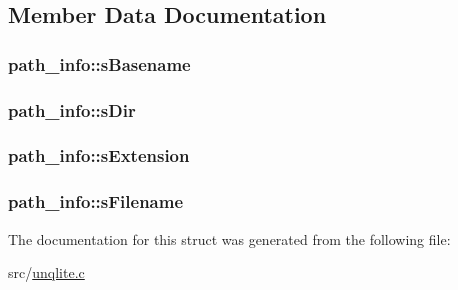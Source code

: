 \subsection{Member Data Documentation}
\hypertarget{structpath__info_aa69edee8fe617238ae6cc09a1137e516}{
\subsubsection[{s\-Basename}]{ path\-\_\-info\-::s\-Basename}}\label{d3/d46/structpath__info_aa69edee8fe617238ae6cc09a1137e516}
\hypertarget{structpath__info_aea865c2965bdfd0fe686550074bcf8cf}{
\subsubsection[{s\-Dir}]{ path\-\_\-info\-::s\-Dir}}\label{d3/d46/structpath__info_aea865c2965bdfd0fe686550074bcf8cf}
\hypertarget{structpath__info_a341842278bfb23bfd8edce7cc208a988}{
\subsubsection[{s\-Extension}]{ path\-\_\-info\-::s\-Extension}}\label{d3/d46/structpath__info_a341842278bfb23bfd8edce7cc208a988}
\hypertarget{structpath__info_ae495b29fdcfd0b9ff97f011d7cfb0bef}{
\subsubsection[{s\-Filename}]{ path\-\_\-info\-::s\-Filename}}\label{d3/d46/structpath__info_ae495b29fdcfd0b9ff97f011d7cfb0bef}


The documentation for this struct was generated from the following file\-:\begin{DoxyCompactItemize}
\item 
src/\hyperlink{unqlite_8c}{unqlite.\-c}\end{DoxyCompactItemize}
